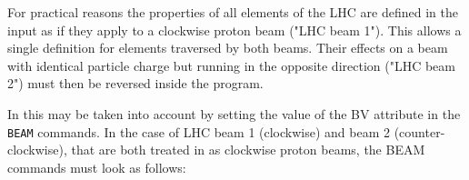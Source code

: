 For practical reasons the properties of all elements of the LHC are
defined in the \mad input as if they apply to a clockwise proton beam
("LHC beam 1"). This allows a single definition for elements traversed
by both beams. Their effects on a beam with identical particle charge
but running in the opposite direction ("LHC beam 2") must then be
reversed inside the program.  

In \mad this may be taken into account by setting the value of
the BV attribute in the {\tt BEAM} commands. In the case of LHC beam 1
(clockwise) and beam 2 (counter-clockwise), that are both treated in
\mad as clockwise proton beams, the BEAM commands must look as follows:  





